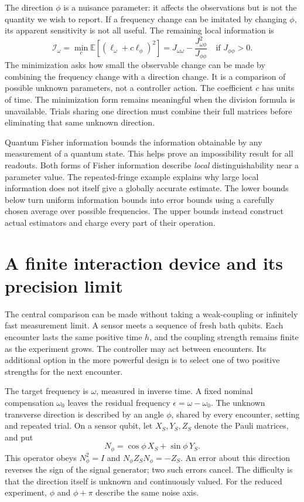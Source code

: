 \documentclass[11pt,a4paper]{article}
\numberwithin{equation}{section}
\theoremstyle{remark}
\newcommand{\E}{\mathbb E}
\begin{document}
The direction $\phi$ is a nuisance parameter: it affects the observations
but is not the quantity we wish to report. If a frequency change can be
imitated by changing $\phi$, its apparent sensitivity is not all useful.
The remaining local information is
\begin{equation}
 \mathcal I_\omega
 =\min_c\E[(\ell_\omega+c\ell_\phi)^2]
 =J_{\omega\omega}-\frac{J_{\omega\phi}^2}{J_{\phi\phi}}
 \quad\text{if }J_{\phi\phi}>0.
 \label{intro:efficient}
\end{equation}
The minimization asks how small the observable change can be made by
combining the frequency change with a direction change. It is a comparison
of possible unknown parameters, not a controller action. The coefficient
$c$ has units of time. The minimization form remains meaningful when the
division formula is unavailable. Trials sharing one direction must combine
their full matrices before eliminating that same unknown direction.

Quantum Fisher information bounds the information obtainable by any
measurement of a quantum state. This helps prove an impossibility result for
all readouts. Both forms of Fisher information describe \emph{local}
distinguishability near a parameter value. The repeated-fringe example
explains why large local information does not itself give a globally accurate
estimate. The lower bounds below turn uniform information bounds into error
bounds using a carefully chosen average over possible frequencies. The upper
bounds instead construct actual estimators and charge every part of their
operation.


\section{A finite interaction device and its precision limit}
\label{micro:device}

The central comparison can be made without taking a weak-coupling or
infinitely fast measurement limit. A sensor meets a sequence of fresh bath
qubits. Each encounter lasts the same positive time $h$, and the coupling
strength remains finite as the experiment grows. The controller may act
between encounters. Its additional option in the more powerful design is to
select one of two positive strengths for the next encounter.

The target frequency is $\omega$, measured in inverse time. A fixed nominal
compensation $\omega_0$ leaves the residual frequency
$\epsilon=\omega-\omega_0$. The unknown transverse direction is described by
an angle $\phi$, shared by every encounter, setting and repeated trial.
On a sensor qubit, let $X_S,Y_S,Z_S$ denote the Pauli matrices, and put
\begin{equation}
 N_\phi=\cos\phi\,X_S+\sin\phi\,Y_S.
 \label{micro:axis}
\end{equation}
This operator obeys $N_\phi^2=I$ and $N_\phi Z_SN_\phi=-Z_S$.
An error about this direction reverses the sign of the signal generator;
two such errors cancel. The difficulty is that the direction itself is
unknown and continuously valued. For the reduced experiment, $\phi$ and
$\phi+\pi$ describe the same noise axis.
\end{document}
